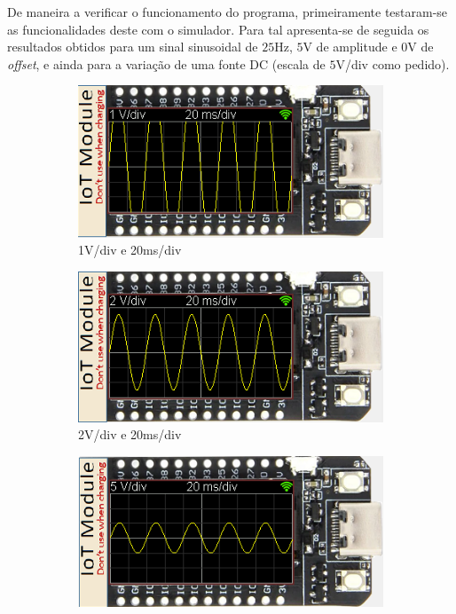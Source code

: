 De maneira a verificar o funcionamento do programa, primeiramente testaram-se as funcionalidades deste com o simulador. Para tal apresenta-se de seguida os resultados obtidos para um sinal sinusoidal de $25$Hz, $5$V de amplitude e $0$V de \textit{offset}, e ainda para a variação de uma fonte DC (escala de $5$V/div como pedido).

\begin{figure}[H]
    \centering
    \begin{subfigure}{0.35\textwidth}
        \centering
        \includegraphics[width=1\linewidth]{Imagens/Testes no simulador/Vertical 1V.png}
        \captionsetup{justification=centering}
        \caption{1V/div e 20ms/div}
        \label{fig:1V/div e 20ms/div simulador}
    \end{subfigure}
    \begin{subfigure}{0.35\textwidth}
        \centering
        \includegraphics[width=1\linewidth]{Imagens/Testes no simulador/Vertical 2V.png}
        \captionsetup{justification=centering}
        \caption{2V/div e 20ms/div}
        \label{fig:2V/div e 20ms/div simulador}
    \end{subfigure}
    \begin{subfigure}{0.35\textwidth}
        \centering
        \includegraphics[width=1\linewidth]{Imagens/Testes no simulador/Vertical 5V.png}

\end{subfigure}
\end{figure}
